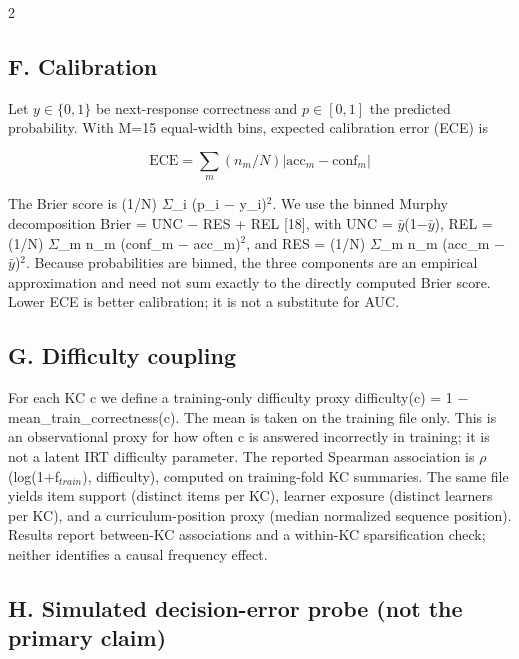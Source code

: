 \documentclass[10pt,a4paper]{article}
\begin{document}
\vspace{0.55em}
\begin{multicols}{2}


\subsection*{F. Calibration}

Let $y\in\{0,1\}$ be next-response correctness and $p\in[0,1]$ the predicted probability. With M=15 equal-width bins, expected calibration error (ECE) is

\begin{equation}
\mathrm{ECE}=\sum_{m}(n_{m}/N)\left|\mathrm{acc}_{m}-\mathrm{conf}_{m}\right|
\end{equation}

The Brier score is (1/N) $\Sigma$\_i (p\_i $-$ y\_i)$^2$. We use the binned Murphy decomposition Brier = UNC $-$ RES + REL [18], with UNC = $\bar{y}$(1$-$$\bar{y}$), REL = (1/N) $\Sigma$\_m n\_m (conf\_m $-$ acc\_m)$^2$, and RES = (1/N) $\Sigma$\_m n\_m (acc\_m $-$ $\bar{y}$)$^2$. Because probabilities are binned, the three components are an empirical approximation and need not sum exactly to the directly computed Brier score. Lower ECE is better calibration; it is not a substitute for AUC.

\subsection*{G. Difficulty coupling}

For each KC c we define a training-only difficulty proxy difficulty(c) = 1 $-$ mean\_train\_correctness(c). The mean is taken on the training file only. This is an observational proxy for how often c is answered incorrectly in training; it is not a latent IRT difficulty parameter. The reported Spearman association is $\rho$(log(1+f$_{train}$), difficulty), computed on training-fold KC summaries. The same file yields item support (distinct items per KC), learner exposure (distinct learners per KC), and a curriculum-position proxy (median normalized sequence position). Results report between-KC associations and a within-KC sparsification check; neither identifies a causal frequency effect.

\subsection*{H. Simulated decision-error probe (not the primary claim)}


\end{multicols}
\end{document}
